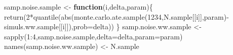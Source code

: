 \documentclass[
]{book}
\newenvironment{Shaded}{\begin{snugshade}}{\end{snugshade}}
\newcommand{\AttributeTok}[1]{\textcolor[rgb]{0.77,0.63,0.00}{#1}}
\newcommand{\ControlFlowTok}[1]{\textcolor[rgb]{0.13,0.29,0.53}{\textbf{#1}}}
\newcommand{\DecValTok}[1]{\textcolor[rgb]{0.00,0.00,0.81}{#1}}
\newcommand{\FunctionTok}[1]{\textcolor[rgb]{0.00,0.00,0.00}{#1}}
\newcommand{\NormalTok}[1]{#1}
\newcommand{\OtherTok}[1]{\textcolor[rgb]{0.56,0.35,0.01}{#1}}
\newcommand{\SpecialCharTok}[1]{\textcolor[rgb]{0.00,0.00,0.00}{#1}}
\theoremstyle{definition}
\theoremstyle{definition}
\theoremstyle{definition}
\theoremstyle{definition}
\theoremstyle{remark}
\begin{document}
\begin{Shaded}
\begin{Highlighting}[]
\NormalTok{samp.noise.sample }\OtherTok{\textless{}{-}} \ControlFlowTok{function}\NormalTok{(i,delta,param)\{}
  \FunctionTok{return}\NormalTok{(}\DecValTok{2}\SpecialCharTok{*}\FunctionTok{quantile}\NormalTok{(}\FunctionTok{abs}\NormalTok{(}\FunctionTok{monte.carlo.ate.sample}\NormalTok{(}\DecValTok{1234}\NormalTok{,N.sample[[i]],param)}\SpecialCharTok{{-}}\NormalTok{simuls.ww.sample[[i]]),}\AttributeTok{prob=}\NormalTok{delta))}
\NormalTok{\}}
\NormalTok{samp.noise.ww.sample }\OtherTok{\textless{}{-}} \FunctionTok{sapply}\NormalTok{(}\DecValTok{1}\SpecialCharTok{:}\DecValTok{4}\NormalTok{,samp.noise.sample,}\AttributeTok{delta=}\NormalTok{delta,}\AttributeTok{param=}\NormalTok{param)}
\FunctionTok{names}\NormalTok{(samp.noise.ww.sample) }\OtherTok{\textless{}{-}}\NormalTok{ N.sample}


\end{Highlighting}
\end{Shaded}
\end{document}
